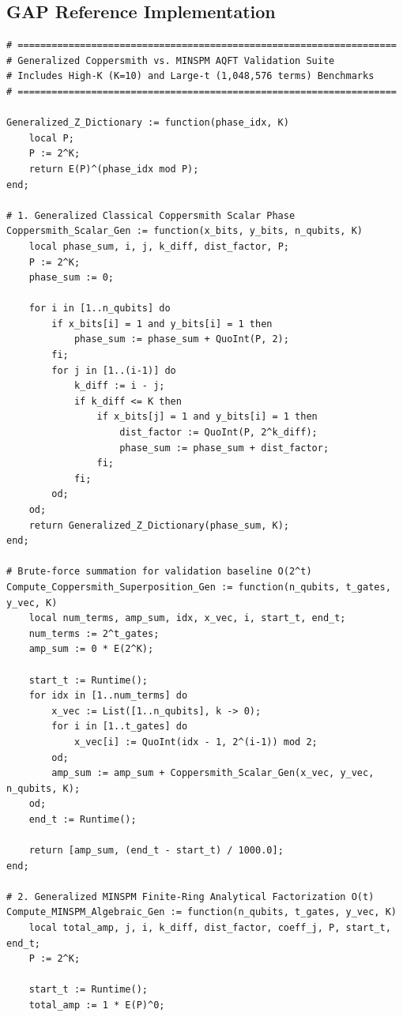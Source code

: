 \documentclass[11pt, a4paper]{article}
\begin{document}
\subsection{GAP Reference Implementation}
\begin{lstlisting}
# ===================================================================
# Generalized Coppersmith vs. MINSPM AQFT Validation Suite
# Includes High-K (K=10) and Large-t (1,048,576 terms) Benchmarks
# ===================================================================

Generalized_Z_Dictionary := function(phase_idx, K)
    local P;
    P := 2^K;
    return E(P)^(phase_idx mod P);
end;

# 1. Generalized Classical Coppersmith Scalar Phase
Coppersmith_Scalar_Gen := function(x_bits, y_bits, n_qubits, K)
    local phase_sum, i, j, k_diff, dist_factor, P;
    P := 2^K;
    phase_sum := 0;
    
    for i in [1..n_qubits] do
        if x_bits[i] = 1 and y_bits[i] = 1 then
            phase_sum := phase_sum + QuoInt(P, 2);
        fi;
        for j in [1..(i-1)] do
            k_diff := i - j;
            if k_diff <= K then
                if x_bits[j] = 1 and y_bits[i] = 1 then
                    dist_factor := QuoInt(P, 2^k_diff);
                    phase_sum := phase_sum + dist_factor;
                fi;
            fi;
        od;
    od;
    return Generalized_Z_Dictionary(phase_sum, K);
end;

# Brute-force summation for validation baseline O(2^t)
Compute_Coppersmith_Superposition_Gen := function(n_qubits, t_gates, y_vec, K)
    local num_terms, amp_sum, idx, x_vec, i, start_t, end_t;
    num_terms := 2^t_gates;
    amp_sum := 0 * E(2^K);
    
    start_t := Runtime();
    for idx in [1..num_terms] do
        x_vec := List([1..n_qubits], k -> 0);
        for i in [1..t_gates] do
            x_vec[i] := QuoInt(idx - 1, 2^(i-1)) mod 2;
        od;
        amp_sum := amp_sum + Coppersmith_Scalar_Gen(x_vec, y_vec, n_qubits, K);
    od;
    end_t := Runtime();
    
    return [amp_sum, (end_t - start_t) / 1000.0];
end;

# 2. Generalized MINSPM Finite-Ring Analytical Factorization O(t)
Compute_MINSPM_Algebraic_Gen := function(n_qubits, t_gates, y_vec, K)
    local total_amp, j, i, k_diff, dist_factor, coeff_j, P, start_t, end_t;
    P := 2^K;
    
    start_t := Runtime();
    total_amp := 1 * E(P)^0;
    

\end{lstlisting}
\end{document}
